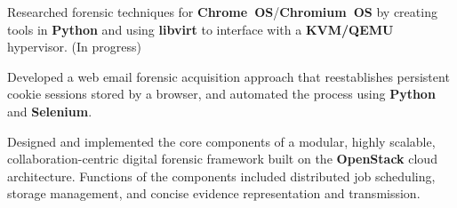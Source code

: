 


\begin{rExperience}




        \item Researched forensic techniques for \textbf{Chrome~OS}/\textbf{Chromium~OS} by creating tools in \textbf{Python} and using \textbf{libvirt} to interface with a \textbf{KVM/QEMU} hypervisor. (In progress)

        \item Developed a web email forensic acquisition approach that reestablishes persistent cookie sessions stored by a browser, and automated the process using \textbf{Python} and \textbf{Selenium}.

        \item Designed and implemented the core components of a modular, highly scalable, collaboration-centric digital forensic framework built on the \textbf{OpenStack} cloud architecture. Functions of the components included distributed job scheduling, storage management, and concise evidence representation and transmission.



\end{rExperience}
